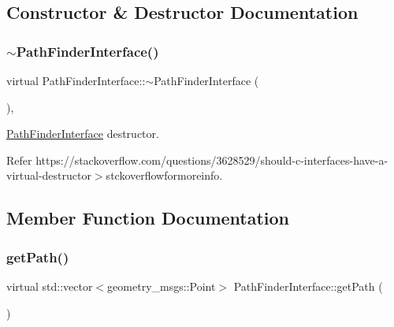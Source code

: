 \subsection{Constructor \& Destructor Documentation}
\mbox{\label{classPathFinderInterface_a9c6812f65fba254224a475a4128441a8}} 
\subsubsection{\texorpdfstring{$\sim$\+Path\+Finder\+Interface()}{~PathFinderInterface()}}
{\footnotesize\ttfamily virtual Path\+Finder\+Interface\+::$\sim$\+Path\+Finder\+Interface (\begin{DoxyParamCaption}{ }\end{DoxyParamCaption})\hspace{0.3cm}{\ttfamily [inline]}, {\ttfamily [virtual]}}



\hyperlink{classPathFinderInterface}{Path\+Finder\+Interface} destructor. 

Refer https\+://stackoverflow.\+com/questions/3628529/should-\/c-\/interfaces-\/have-\/a-\/virtual-\/destructor$>$stckoverflowformoreinfo.

\subsection{Member Function Documentation}
\mbox{\label{classPathFinderInterface_adb55c9eab1ef3c4c1374c9d4313631de}} 
\subsubsection{\texorpdfstring{get\+Path()}{getPath()}}
{\footnotesize\ttfamily virtual std\+::vector$<$geometry\+\_\+msgs\+::\+Point$>$ Path\+Finder\+Interface\+::get\+Path (\begin{DoxyParamCaption}{ }\end{DoxyParamCaption})\hspace{0.3cm}{\ttfamily [pure virtual]}}



